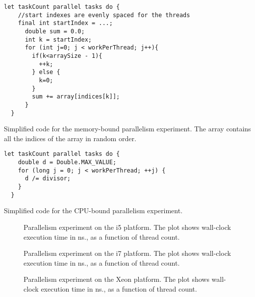 \begin{code}
\begin{Verbatim}[frame=single]
  let taskCount parallel tasks do {
    //start indexes are evenly spaced for the threads
    final int startIndex = ...;
      double sum = 0.0;
      int k = startIndex;
      for (int j=0; j < workPerThread; j++){
        if(k<arraySize - 1){
          ++k;
        } else {
          k=0;
        }
        sum += array[indices[k]];
      }
  }
\end{Verbatim}
	\caption{Simplified code for the memory-bound parallelism experiment.
	The \java[indices] array contains all the indices of the 
	array in random order.}
	\label{code:sum}
\end{code}

\begin{code}
\begin{Verbatim}[frame=single]
  let taskCount parallel tasks do {
    double d = Double.MAX_VALUE;
    for (long j = 0; j < workPerThread; ++j) {
      d /= divisor;
    }
  }
\end{Verbatim}
	\caption{Simplified code for the CPU-bound parallelism experiment.}
	\label{code:div}
\end{code}

\begin{figure}[hbpt]
\graphicspath{{plots/}}

	\caption{Parallelism experiment on the i5 platform. The plot shows
	wall-clock execution time in ns., as a function of thread count.}
	\label{fig:parallel-i5}
\end{figure}

\begin{figure}[hbpt]
\graphicspath{{plots/}}

	\caption{Parallelism experiment on the i7 platform. The plot shows
	wall-clock execution time in ns., as a function of thread count.}
	\label{fig:parallel-i7}
\end{figure}

\begin{figure}[hbpt]
\graphicspath{{plots/}}

	\caption{Parallelism experiment on the Xeon platform. The plot shows
	wall-clock execution time in ns., as a function of thread count.}
	\label{fig:parallel-xeon}
\end{figure}


